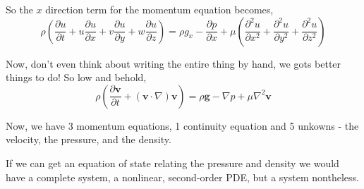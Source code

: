 \documentclass[10pt,a4paper,draft]{article}
\begin{document}
So the $x$ direction term for the momentum equation becomes,
\begin{equation}
\rho\left( 
	\frac{\partial u}{\partial t} + u\frac{\partial u}{\partial x} + v\frac{\partial u}{\partial y} + w\frac{\partial u}{\partial z}
\right)
= 
  \rho g_x 
- \frac{\partial p}{\partial x}
+ \mu\left(
	\frac{\partial^2 u}{\partial x^2} + \frac{\partial^2 u}{\partial y^2} + \frac{\partial^2 u}{\partial z^2}
	\right)	
\end{equation}


Now, don't even think about writing the entire thing by hand, we gots better things to do!
So low and behold,
\begin{equation}
\rho\left( 
	\frac{\partial \mathbf{v}}{\partial t} 
	+ \left(\mathbf{v}\cdot\nabla\right)\mathbf{v}
\right)
=
\rho\mathbf{g}
- \nabla p
+ \mu \nabla^2 \mathbf{v} 
\end{equation}

Now, we have 3 momentum equations, 1 continuity equation and 5 unkowns - the velocity, the pressure, and the density.

If we can get an equation of state relating the pressure and density we would have a complete system, a nonlinear, second-order PDE, but a system nontheless.
\end{document}
